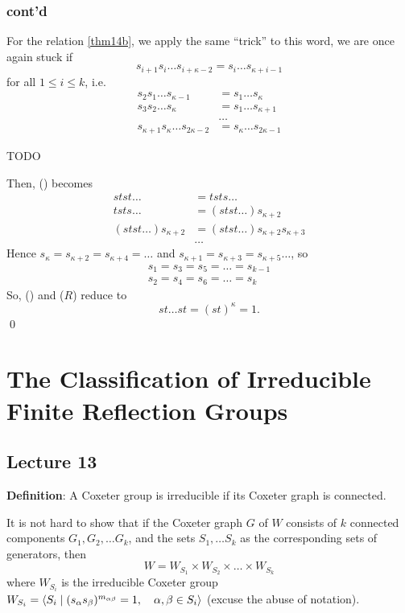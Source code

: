 \subsection{cont'd}

For the relation \eqref{thm14b}, we apply the same ``trick'' to this word,
we are once again stuck if
\[
    s_{i+1} s_i \dots s_{i+\kappa-2} = s_i \dots s_{\kappa+i-1}
\]
for all $1 \leq i \leq k$, i.e.
\begin{align*}
    s_2 s_1 \dots s_{\kappa-1} &= s_1 \dots s_{\kappa} \\
    s_3 s_2 \dots s_{\kappa} &= s_1 \dots s_{\kappa+1} \\
    & \dots \\
    s_{\kappa+1} s_{\kappa} \dots s_{2\kappa-2} &= s_{\kappa} \dots s_{2\kappa-1}
\end{align*}

TODO

Then, (\textasteriskcentered\textasteriskcentered) becomes
\begin{align*}
    stst \dots &= tsts \dots \\
    tsts \dots &= (stst \dots) s_{\kappa+2} \\
    (stst \dots) s_{\kappa+2} &= (stst \dots) s_{\kappa+2} s_{\kappa+3} \\
    & \dots
\end{align*}
Hence $s_\kappa = s_{\kappa+2} = s_{\kappa+4} = \dots$ and
$s_{\kappa+1} = s_{\kappa+3} = s_{\kappa+5} \dots$, so
\begin{align*}
    s_1 = s_3 = s_5 = \dots = s_{k-1} \\
    s_2 = s_4 = s_6 = \dots = s_{k}
\end{align*}
So, (\textasteriskcentered\textasteriskcentered) and ($R$) reduce to
\[
    st \dots st = (st)^\kappa = 1.
\]
\qed

\chapter{The Classification of Irreducible Finite Reflection Groups}

\section{Lecture 13}

{\bf Definition}: A Coxeter group is irreducible if its Coxeter graph is
connected.

It is not hard to show that if the Coxeter graph $G$ of $W$ consists of $k$
connected components $G_1, G_2, \dots G_k$, and the sets $S_1, \dots S_k$ as
the corresponding sets of generators, then
\[
    W = W_{S_1} \times W_{S_2} \times \dots \times W_{S_k}
\]
where $W_{S_i}$ is the irreducible Coxeter group $W_{S_i} = \langle S_i \mid
(s_\alpha s_\beta)^{m_{\alpha \beta}} = 1, \quad \alpha, \beta \in S_i \rangle$
(excuse the abuse of notation).


